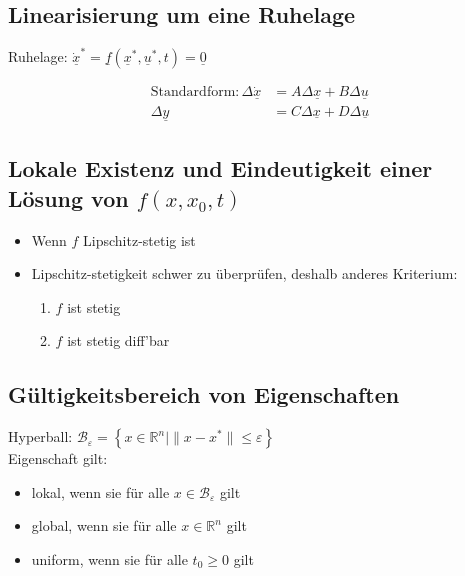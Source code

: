 \documentclass[german]{latex4ei/latex4ei_sheet}
\begin{document}
\begin{sectionbox}
\subsection{Linearisierung um eine Ruhelage}

Ruhelage: $\underline{\dot{x}}^* = \underline{f}\left( \underline{x}^*, \underline{u}^*, t \right) = \underline{0}$

\begin{align*}
  \text{Standardform:} \,
  \Delta \underline{\dot{x}}    &=  A \Delta\underline{x} + B \Delta\underline{u} \\
  \Delta \underline{y}          &=  C \Delta\underline{x} + D \Delta\underline{u}
\end{align*}

\subsection{Lokale Existenz und Eindeutigkeit einer Lösung von $f(x,x_0,t)$}

\begin{itemize}
  \item Wenn $f$ Lipschitz-stetig ist
  \item Lipschitz-stetigkeit schwer zu überprüfen, deshalb anderes Kriterium:
    \begin{enumerate}
      \item $f$ ist stetig
      \item $f$ ist stetig diff'bar
    \end{enumerate}
\end{itemize}

\subsection{Gültigkeitsbereich von Eigenschaften}
Hyperball: $\mathcal{B}_\varepsilon = \left\{ x \in \mathbb{R}^n | \|x-x^*\| \leq \varepsilon \right\}$ \\
Eigenschaft gilt:
\begin{itemize}
  \item lokal, wenn sie für alle $x \in \mathcal{B}_\varepsilon$ gilt
  \item global, wenn sie für alle $x \in \mathbb{R}^n$ gilt
  \item uniform, wenn sie für alle $t_0 \geq 0$ gilt
\end{itemize}
\end{sectionbox}
\end{document}
